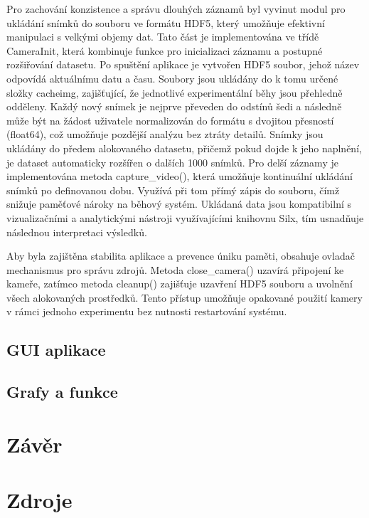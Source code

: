 \documentclass[a4paper]{article}
\begin{document}
Pro zachování konzistence a správu dlouhých záznamů byl vyvinut modul pro ukládání snímků do souboru ve formátu HDF5, který umožňuje efektivní manipulaci s velkými objemy dat. Tato část je implementována ve třídě CameraInit, která kombinuje funkce pro inicializaci záznamu a postupné rozšiřování datasetu. Po spuštění aplikace je vytvořen HDF5 soubor, jehož název odpovídá aktuálnímu datu a času. Soubory jsou ukládány do k tomu určené složky cacheimg, zajišťující, že jednotlivé experimentální běhy jsou přehledně odděleny.
Každý nový snímek je nejprve převeden do odstínů šedi a následně může být na žádost uživatele normalizován do formátu s dvojitou přesností (float64), což umožňuje pozdější analýzu bez ztráty detailů. Snímky jsou ukládány do předem alokovaného datasetu, přičemž pokud dojde k jeho naplnění, je dataset automaticky rozšířen o dalších 1000 snímků. Pro delší záznamy je implementována metoda capture\_video(), která umožňuje kontinuální ukládání snímků po definovanou dobu. Využívá při tom přímý zápis do souboru, čímž snižuje paměťové nároky na běhový systém. Ukládaná data jsou kompatibilní s vizualizačními a analytickými nástroji využívajícími knihovnu Silx, tím usnadňuje následnou interpretaci výsledků.

Aby byla zajištěna stabilita aplikace a prevence úniku paměti, obsahuje ovladač mechanismus pro správu zdrojů. Metoda close\_camera() uzavírá připojení ke kameře, zatímco metoda cleanup() zajišťuje uzavření HDF5 souboru a uvolnění všech alokovaných prostředků. Tento přístup umožňuje opakované použití kamery v rámci jednoho experimentu bez nutnosti restartování systému.
    




\subsection{GUI aplikace}

\subsection{Grafy a funkce}

\section{Závěr}

\section{Zdroje}
\end{document}
